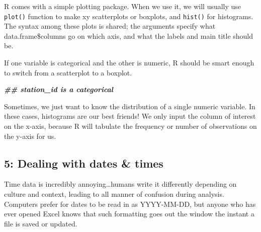 \documentclass[
]{article}
\newenvironment{Shaded}{\begin{snugshade}}{\end{snugshade}}
\newcommand{\CommentTok}[1]{\textcolor[rgb]{0.56,0.35,0.01}{\textit{#1}}}
\newcommand{\DocumentationTok}[1]{\textcolor[rgb]{0.56,0.35,0.01}{\textbf{\textit{#1}}}}
\begin{document}
R comes with a simple plotting package. When we use it, we will usually
use \texttt{plot()} function to make xy scatterplots or boxplots, and
\texttt{hist()} for histograms. The syntax among these plots is shared;
the arguments specify what data.frame\$columns go on which axis, and
what the labels and main title should be.

\begin{Shaded}
\end{Shaded}

If one variable is categorical and the other is numeric, R should be
smart enough to switch from a scatterplot to a boxplot.

\begin{Shaded}
\begin{Highlighting}[]
\DocumentationTok{\#\# station\_id is a categorical}
\end{Highlighting}
\end{Shaded}

Sometimes, we just want to know the distribution of a single numeric
variable. In these cases, histograms are our best friends! We only input
the column of interest on the x-axis, because R will tabulate the
frequency or number of observations on the y-axis for us.

\subsection{5: Dealing with dates \&
times}\label{dealing-with-dates-times}

Time data is incredibly annoying\ldots humans write it differently
depending on culture and context, leading to all manner of confusion
during analysis. Computers prefer for dates to be read in as YYYY-MM-DD,
but anyone who has ever opened Excel knows that such formatting goes out
the window the instant a file is saved or updated.
\end{document}
